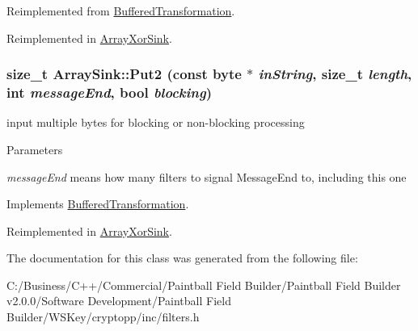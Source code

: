 Reimplemented from \hyperlink{class_buffered_transformation_af390325c959c3d6a2c03a447d6cd469d}{BufferedTransformation}.

Reimplemented in \hyperlink{class_array_xor_sink_a39567ce27137cc06ed9a2b0a1c834f01}{ArrayXorSink}.\hypertarget{class_array_sink_a2e29344d51a7912e0a88dde1ae4ca556}{
\subsubsection[{Put2}]{\setlength{\rightskip}{0pt plus 5cm}size\_\-t ArraySink::Put2 (const byte $\ast$ {\em inString}, \/  size\_\-t {\em length}, \/  int {\em messageEnd}, \/  bool {\em blocking})}}
\label{class_array_sink_a2e29344d51a7912e0a88dde1ae4ca556}


input multiple bytes for blocking or non-\/blocking processing 
\begin{DoxyParams}{Parameters}
\item[{\em messageEnd}]means how many filters to signal MessageEnd to, including this one \end{DoxyParams}


Implements \hyperlink{class_buffered_transformation_ad396dcb42260f23125a35ec0e5d17d55}{BufferedTransformation}.

Reimplemented in \hyperlink{class_array_xor_sink_adc9d43ea392d62c8e87f29702085da3e}{ArrayXorSink}.

The documentation for this class was generated from the following file:\begin{DoxyCompactItemize}
\item 
C:/Business/C++/Commercial/Paintball Field Builder/Paintball Field Builder v2.0.0/Software Development/Paintball Field Builder/WSKey/cryptopp/inc/filters.h\end{DoxyCompactItemize}
